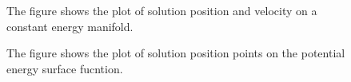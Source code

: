\documentclass{article}
\begin{document}
\begin{figure}[H]
\begin{centering}
\caption{The figure shows the plot of solution position and velocity on a constant energy manifold.}
\end{centering}
\end{figure}

\begin{figure}[H]
\begin{centering}
\caption{The figure shows the plot of solution position points on the potential energy surface fucntion.}
\end{centering}
\end{figure}
\end{document}
